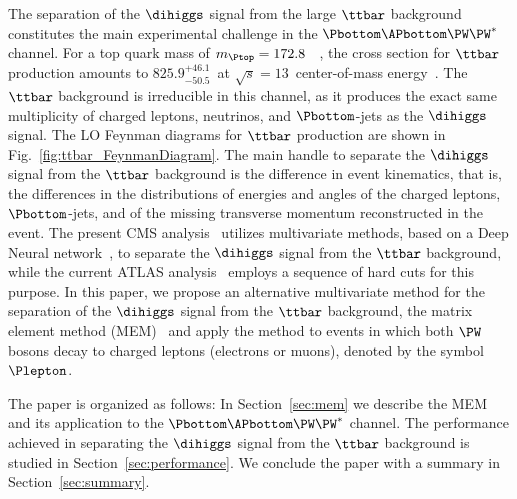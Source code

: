 The separation of the $\dihiggs$ signal from the large $\ttbar$ background constitutes the main experimental challenge in the $\Pbottom\APbottom\PW\PW^{\ast}$ channel.
For a top quark mass of $m_{\Ptop} = 172.8$~\GeV~\cite{PDG},
the cross section for $\ttbar$ production amounts to $825.9^{+46.1}_{-50.5}$~\pb at $\sqrt{s} = 13$~\TeV center-of-mass energy~\cite{Czakon:2011xx}.
The $\ttbar$ background is irreducible in this channel, as it produces the exact same multiplicity of charged leptons, neutrinos, and $\Pbottom$-jets as the $\dihiggs$ signal.
The LO Feynman diagrams for $\ttbar$ production are shown in Fig.~\ref{fig:ttbar_FeynmanDiagram}.
The main handle to separate the $\dihiggs$ signal from the $\ttbar$ background is the difference in event kinematics,
that is, the differences in the distributions of energies and angles of the charged leptons, $\Pbottom$-jets, and of the missing transverse momentum reconstructed in the event.
The present CMS analysis~\cite{HIG-17-006} utilizes multivariate methods, based on a Deep Neural network~\cite{ANN,chollet2015keras},
to separate the $\dihiggs$ signal from the $\ttbar$ background, while the current ATLAS analysis~\cite{Aaboud:2018zhh} employs a sequence of hard cuts for this purpose.
In this paper, we propose an alternative multivariate method for the separation of the $\dihiggs$ signal from the $\ttbar$ background,
the matrix element method (MEM)~\cite{Kondo:1988yd,Kondo:1991dw} and apply the method to events in which both $\PW$ bosons decay to charged leptons (electrons or muons),
denoted by the symbol $\Plepton$.

The paper is organized as follows:
In Section~\ref{sec:mem} we describe the MEM and its application to the $\Pbottom\APbottom\PW\PW^{\ast}$ channel.
The performance achieved in separating the $\dihiggs$ signal 
from the $\ttbar$ background is studied in Section~\ref{sec:performance}.
We conclude the paper with a summary in Section~\ref{sec:summary}.
